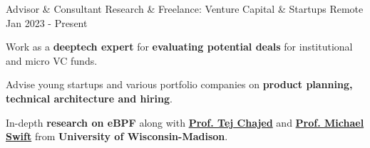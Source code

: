 

\begin{cventries}


  \cventry
    {Advisor \& Consultant} %
    {Research \& Freelance: Venture Capital \& Startups} %
    {Remote} %
    {Jan 2023 - Present} %
    {
      \begin{cvitems} %
      \item {Work as a \textbf{deeptech expert} for \textbf{evaluating potential deals} for institutional and micro VC funds.}
      \item {Advise young startups and various portfolio companies on \textbf{product planning, technical architecture and hiring}.}
      \item {In-depth \textbf{research on eBPF} along with \href{https://www.chajed.io/}{\textbf{Prof. Tej Chajed}} and \href{https://pages.cs.wisc.edu/~swift/}{\textbf{Prof. Michael Swift}} from \textbf{University of Wisconsin-Madison}}.
      \end{cvitems}
    }



\end{cventries}
